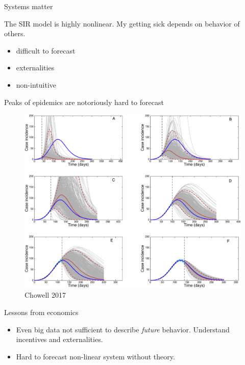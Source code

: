 \documentclass[ignorenonframetext,aspectratio=54,]{beamer}
\providecommand{\tightlist}{%
  \setlength{\itemsep}{0pt}\setlength{\parskip}{0pt}}
\begin{document}
\begin{frame}{Systems matter}
\protect\hypertarget{systems-matter}{}

The SIR model is highly nonlinear. My getting sick depends on behavior
of others.

\begin{itemize}
\tightlist
\item
  difficult to forecast
\item
  externalities
\item
  non-intuitive
\end{itemize}

\end{frame}

\begin{frame}{Peaks of epidemics are notoriously hard to forecast}
\protect\hypertarget{peaks-of-epidemics-are-notoriously-hard-to-forecast}{}

\begin{figure}
\centering
\includegraphics[width=\textwidth,height=0.8\textheight]{exhibit/fig/nonlinear.jpg}
\caption{Chowell 2017}
\end{figure}

\end{frame}

\begin{frame}{Lessons from economics}
\protect\hypertarget{lessons-from-economics}{}

\begin{itemize}
\tightlist
\item
  Even big data not sufficient to describe \emph{future} behavior.
  Understand incentives and externalities.
\item
  Hard to forecast non-linear system without theory.
\end{itemize}

\end{frame}
\end{document}
